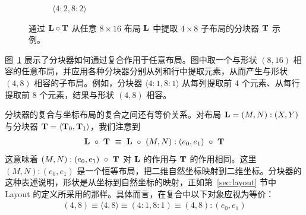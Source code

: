 \begin{figure}[ht]
\begin{subfigure}{0.22\textwidth}
\centering
{}
\caption{$\langle 4:2,8:2 \rangle$}
\end{subfigure}
\caption{通过 $\mathbf{L} \circ \mathbf{T}$ 从任意 $8{\times}16$ 布局 $\mathbf{L}$ 中提取 $4 {\times} 8$ 子布局的分块器 $\mathbf{T}$ 示例。}
\label{fig:tilers}
\end{figure}

图~\ref{fig:tilers} 展示了分块器如何通过复合作用于任意布局。图中取一个与形状 $(8,16)$ 相容的任意布局，并应用各种分块器分别从列和行中提取元素，从而产生与形状 $(4,8)$ 相容的子布局。例如，分块器 $\langle 4:1, 8:1 \rangle$ 从每列提取前 4 个元素、从每行提取前 8 个元素，结果与形状 $(4,8)$ 相容。

分块器的复合与坐标布局的复合之间还有等价关系。对布局 $\mathbf{L} = (M,N) : (X,Y)$ 与分块器 $\mathbf{T} = \langle \mathbf{T}_0, \mathbf{T}_1 \rangle$，我们注意到
\begin{align*}
\mathbf{L} \ \circ \ \mathbf{T} \ \equiv \ \mathbf{L} \ \circ \ (M,N):(e_0,e_1) \ \circ \ \mathbf{T}
\end{align*}
这意味着 $(M,N):(e_0,e_1) \ \circ \ \mathbf{T}$ 对 $\mathbf{L}$ 的作用与 $\mathbf{T}$ 的作用相同。这里 $(M,N):(e_0,e_1)$ 是一个恒等布局，把二维自然坐标映射到二维坐标。分块器的这种表述说明，形状是从坐标到自然坐标的映射，正如第~\ref{sec:layout} 节中 Layout 的定义所采用的那样。具体而言，在复合中以下对象应视为等价：
\begin{align*}
(4,8) \equiv \langle 4, 8 \rangle \equiv (4:1, 8:1) \equiv (4,8):(e_0,e_1)
\end{align*}
